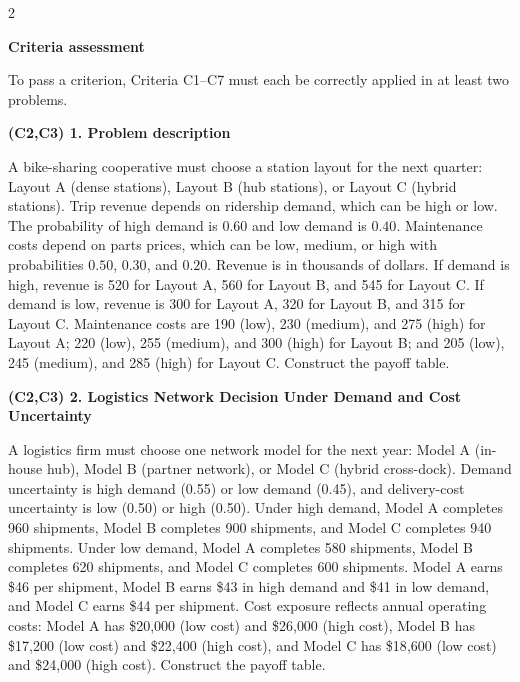 \documentclass[12pt]{article}
\newcommand{\SubsectionBox}[1]{%
	\noindent\colorbox{gray!30}{%
		\parbox{\linewidth}{\textbf{#1}}%
	}\par\vspace{0.35cm}%
}
\begin{document}
	\vspace{0.4cm}
	
	\begin{multicols}{2}
		
		\SubsectionBox{Criteria assessment}\vspace{-0.25cm}
		To pass a criterion, Criteria C1–C7 must each be correctly applied in at least two problems.
		
		\vspace{0.25cm}
		\SubsectionBox{(C2,C3) 1. Problem description}\vspace{-0.25cm}
		A bike-sharing cooperative must choose a station layout for the next quarter: Layout A (dense stations),
		Layout B (hub stations), or Layout C (hybrid stations). Trip revenue depends on ridership demand,
		which can be high or low. The probability of high demand is $0.60$ and low demand is $0.40$.
		Maintenance costs depend on parts prices, which can be low, medium, or high with probabilities
		$0.50$, $0.30$, and $0.20$. Revenue is in thousands of dollars. If demand is high, revenue is 520 for Layout A,
		560 for Layout B, and 545 for Layout C. If demand is low, revenue is 300 for Layout A, 320 for Layout B,
		and 315 for Layout C. Maintenance costs are 190 (low), 230 (medium), and 275 (high) for Layout A;
		220 (low), 255 (medium), and 300 (high) for Layout B; and 205 (low), 245 (medium), and 285 (high) for Layout C.
		Construct the payoff table.
		
		\vspace{0.25cm}
		\SubsectionBox{(C2,C3) 2. Logistics Network Decision Under Demand and Cost Uncertainty}\vspace{-0.25cm}
		A logistics firm must choose one network model for the next year: Model A (in-house hub),
		Model B (partner network), or Model C (hybrid cross-dock). Demand uncertainty is high demand (0.55)
		or low demand (0.45), and delivery-cost uncertainty is low (0.50) or high (0.50).
		Under high demand, Model A completes 960 shipments, Model B completes 900 shipments, and Model C completes 940 shipments.
		Under low demand, Model A completes 580 shipments, Model B completes 620 shipments, and Model C completes 600 shipments.
		Model A earns \$46 per shipment, Model B earns \$43 in high demand and \$41 in low demand,
		and Model C earns \$44 per shipment. Cost exposure reflects annual operating costs:
		Model A has \$20{,}000 (low cost) and \$26{,}000 (high cost),
		Model B has \$17{,}200 (low cost) and \$22{,}400 (high cost), and
		Model C has \$18{,}600 (low cost) and \$24{,}000 (high cost).
		Construct the payoff table.
		

\end{multicols}
\end{document}
